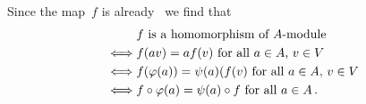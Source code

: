 \subsection{}

Since the map~$f$ is already~{\klin} we find that
\begin{align*}
      &{} \text{$f$ is a homomorphism of~{\Amod}} \\
  \iff&{} \text{$f(av) = af(v)$ for all~$a \in A$,~$v \in V$} \\
  \iff&{} \text{$f(\varphi(a)) = \psi(a)(f(v)$ for all~$a \in A$,~$v \in V$}  \\
  \iff&{} \text{$f \circ \varphi(a) = \psi(a) \circ f$ for all~$a \in A$} \,.
\end{align*}




